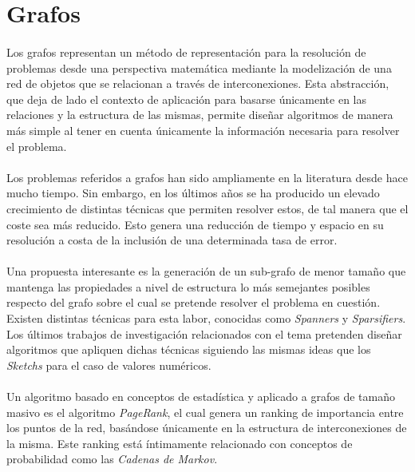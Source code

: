 \documentclass{subfiles}
\begin{document}
    \section{Grafos}
    \label{sec:introduction_graphs}

      \paragraph{}
      Los grafos representan un método de representación para la resolución de problemas desde una perspectiva matemática mediante la modelización de una red de objetos que se relacionan a través de interconexiones. Esta abstracción, que deja de lado el contexto de aplicación para basarse únicamente en las relaciones y la estructura de las mismas, permite diseñar algoritmos de manera más simple al tener en cuenta únicamente la información necesaria para resolver el problema.

      \paragraph{}
      Los problemas referidos a grafos han sido ampliamente en la literatura desde hace mucho tiempo. Sin embargo, en los últimos años se ha producido un elevado crecimiento de distintas técnicas que permiten resolver estos, de tal manera que el coste sea más reducido. Esto genera una reducción de tiempo y espacio en su resolución a costa de la inclusión de una determinada tasa de error.

      \paragraph{}
      Una propuesta interesante es la generación de un sub-grafo de menor tamaño que mantenga las propiedades a nivel de estructura lo más semejantes posibles respecto del grafo sobre el cual se pretende resolver el problema en cuestión. Existen distintas técnicas para esta labor, conocidas como \emph{Spanners} y \emph{Sparsifiers}. Los últimos trabajos de investigación relacionados con el tema pretenden diseñar algoritmos que apliquen dichas técnicas siguiendo las mismas ideas que los \emph{Sketchs} para el caso de valores numéricos.

      \paragraph{}
      Un algoritmo basado en conceptos de estadística y aplicado a grafos de tamaño masivo es el algoritmo \emph{PageRank}, el cual genera un ranking de importancia entre los puntos de la red, basándose únicamente en la estructura de interconexiones de la misma. Este ranking está íntimamente relacionado con conceptos de probabilidad como las \emph{Cadenas de Markov}.
\end{document}
